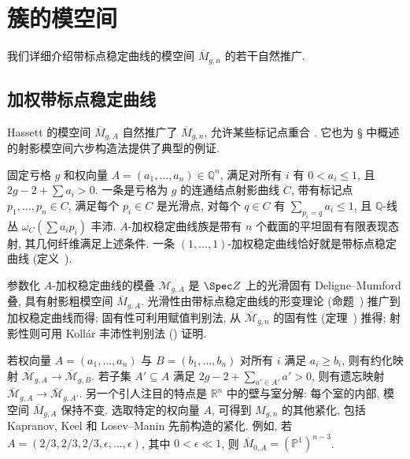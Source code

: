 \section{簇的模空间}\label{src:10.1}
我们详细介绍带标点稳定曲线的模空间 $\overline M_{g,n}$ 的若干自然推广.

\subsection{加权带标点稳定曲线}\label{src:10.1.1-subsection}
Hassett 的模空间 $\overline M_{g,A}$ 自然推广了 $\overline M_{g,n}$, 允许某些标记点重合 \cite{Has03}. 它也为 \S{} 中概述的射影模空间六步构造法提供了典型的例证.

固定亏格 $g$ 和权向量 $A=(a_1,\ldots,a_n)\in\mathbb Q^n$, 满足对所有 $i$ 有 $0<a_i\leq1$, 且 $2g-2+\sum a_i>0$. 一条是亏格为 $g$ 的连通结点射影曲线 $C$, 带有标记点 $p_1,\ldots,p_n\in C$, 满足每个 $p_i\in C$ 是光滑点, 对每个 $q\in C$ 有 $\sum_{p_i=q}a_i\leq1$, 且 $\mathbb Q$-线丛 $\omega_C(\sum a_ip_i)$ 丰沛. $A$-加权稳定曲线族是带有 $n$ 个截面的平坦固有有限表现态射, 其几何纤维满足上述条件. 一条 $(1,\ldots,1)$-加权稳定曲线恰好就是带标点稳定曲线 (定义~).

参数化 $A$-加权稳定曲线的模叠 $\mathcal M_{g,A}$ 是 $\Spec\mathbb Z$ 上的光滑固有 Deligne--Mumford 叠, 具有射影粗模空间 $\overline M_{g,A}$. 光滑性由带标点稳定曲线的形变理论 (命题~) 推广到加权稳定曲线而得; 固有性可利用赋值判别法, 从 $\overline{\mathcal M}_{g,n}$ 的固有性 (定理~) 推得; 射影性则可用 Koll\'ar 丰沛性判别法 () 证明.

若权向量 $A=(a_1,\ldots,a_n)$ 与 $B=(b_1,\ldots,b_n)$ 对所有 $i$ 满足 $a_i\geq b_i$, 则有约化映射 $\overline{\mathcal M}_{g,A}\to\overline{\mathcal M}_{g,B}$. 若子集 $A'\subseteq A$ 满足 $2g-2+\sum_{a'\in A'}a'>0$, 则有遗忘映射 $\overline{\mathcal M}_{g,A}\to\overline{\mathcal M}_{g,A'}$. 另一个引人注目的特点是 $\mathbb R^n$ 中的壁与室分解: 每个室的内部, 模空间 $\overline M_{g,A}$ 保持不变. 选取特定的权向量 $A$, 可得到 $M_{g,n}$ 的其他紧化, 包括 Kapranov, Keel 和 Losev--Manin 先前构造的紧化. 例如, 若 $A=(2/3,2/3,2/3,\epsilon,\ldots,\epsilon)$, 其中 $0<\epsilon\ll1$, 则 $\overline M_{0,A}=(\mathbb P^1)^{n-3}$.

